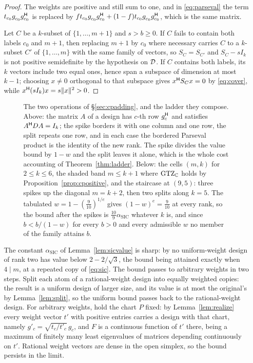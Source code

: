 \begin{proof}
The weights are positive and still sum to one, and in
\eqref{eq:parseval} the term $t_{c_0}g_{c_0}^{\vphantom{\mathsf{H}}}g_{c_0}\adj$ is
replaced by
$f t_{c_0}g_{c_0}^{\vphantom{\mathsf{H}}}g_{c_0}\adj+(1-f)t_{c_0}
g_{c_0}^{\vphantom{\mathsf{H}}}g_{c_0}\adj$, which is the same matrix.

Let $C$ be a $k$-subset of $\{1,\dots,m+1\}$ and $s>b\ge0$.  If $C$ fails
to contain both labels $c_0$ and $m+1$, then replacing $m+1$ by $c_0$ where
necessary carries $C$ to a $k$-subset $C'$ of $\{1,\dots,m\}$ with the
same family of vectors, so $S_C=S_{C'}$ and $S_C-sI_k$ is not positive
semidefinite by the hypothesis on $\mathcal{D}$.  If $C$ contains both labels, its
$k$ vectors include two equal ones, hence span a subspace of dimension at
most $k-1$; choosing $x\ne0$ orthogonal to that subspace gives
$x^{\mathsf{H}} S_Cx=0$ by \eqref{eq:cover}, while
$x^{\mathsf{H}}(sI_k)x=s\lVert x\rVert^{2}>0$.
\end{proof}

\begin{figure}[ht]
  \centering
  
  \caption{The two operations of \S\ref{sec:cpadding}, and the ladder they
  compose.  Above: the matrix $A$ of a design has $c$-th row $g_c^{\mathsf{H}}$ and
  satisfies $A^{\mathsf{H}} DA=I_k$; the spike borders it with one column and one row,
  the split repeats one row, and in each case the bordered Parseval product is
  the identity of the new rank.  The spike divides the value bound by $1-w$
  and the split leaves it alone, which is the whole cost accounting of
  Theorem~\ref{thm:ladder}.  Below: the cells $(m,k)$ for $2\le k\le6$, the
  shaded band $m\le k+1$ where $\mathrm{GTZ}_{\mathbb{C}}$ holds by
  Proposition~\ref{prop:cpositive}, and the staircase at $(9,5)$: three spikes
  up the diagonal $m=k+2$, then two splits along $k=5$.  The tabulated
  $w=1-(\tfrac9{10})^{1/e}$ gives $(1-w)^{e}=\tfrac9{10}$ at every rank, so the
  bound after the spikes is $\tfrac{10}9\alpha_{\mathrm{SIC}}$ whatever $k$ is,
  and since $b<b/(1-w)$ for every $b>0$ and every admissible $w$ no member of
  the family attains $b$.}
  \label{fig:padding}
\end{figure}

The constant $\alpha_{\mathrm{SIC}}$ of Lemma~\ref{lem:sicvalue} is
sharp: by \cite{Nesterenko2026complex} no uniform-weight design of rank
two has value below $2-2/\sqrt3$, the bound being attained exactly when
$4\mid m$, at a repeated copy of \eqref{eq:sic}.  The bound passes to
arbitrary weights in two steps.  Split each atom of a rational-weight
design into equally weighted copies: the result is a uniform design of
larger size, and its value is at most the original's by
Lemma~\ref{lem:split}, so the uniform bound passes back to the
rational-weight design.  For arbitrary weights, hold the chart $P$
fixed: by Lemma~\ref{lem:realize} every weight vector $t'$ with positive
entries carries a design with that chart, namely
$g'_c=\sqrt{t_c/t'_c}\,g_c$, and $F$ is a continuous
function of $t'$ there, being a maximum of finitely many least
eigenvalues of matrices depending continuously on $t'$.  Rational weight
vectors are dense in the open simplex, so the bound persists in the
limit.

